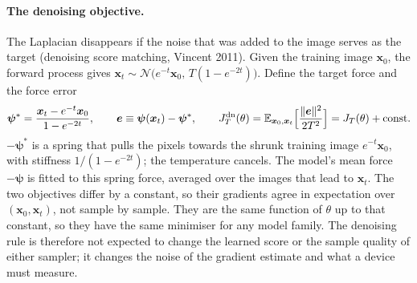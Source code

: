 \documentclass[11pt,a4paper]{article}
\newcommand{\vx}{\bm{x}}
\newcommand{\E}{\mathbb{E}}
\begin{document}
\paragraph{The denoising objective.} The Laplacian disappears if the noise that was added to the image serves as
the target (denoising score matching, Vincent 2011). Given the training image $\vx_0$, the forward process gives
$\vx_t\sim\mathcal N\big(e^{-t}\vx_0,\,T(1-e^{-2t})\big)$. Define the target force and the force error
\begin{equation}
  \bm\psi^*=\frac{\vx_t-e^{-t}\vx_0}{1-e^{-2t}},\qquad \bm e\equiv\bm\psi(\vx_t)-\bm\psi^*,\qquad
  J^{\rm dn}_T(\theta)=\E_{\vx_0,\vx_t}\Big[\frac{\|\bm e\|^2}{2T^2}\Big]=J_T(\theta)+\text{const}.
  \label{eq:denoising}
\end{equation}
$-\bm\psi^*$ is a spring that pulls the pixels towards the shrunk training image $e^{-t}\vx_0$, with stiffness
$1/(1-e^{-2t})$; the temperature cancels. The model's mean force $-\bm\psi$ is fitted to this spring force, averaged
over the images that lead to $\vx_t$. The two objectives differ by a constant, so their gradients agree in
expectation over $(\vx_0,\vx_t)$, not sample by sample. They are the same function of $\theta$ up to that constant,
so they have the same minimiser for any model family. The denoising rule is therefore not expected to change the
learned score or the sample quality of either sampler; it changes the noise of the gradient estimate and what a
device must measure.
\end{document}
